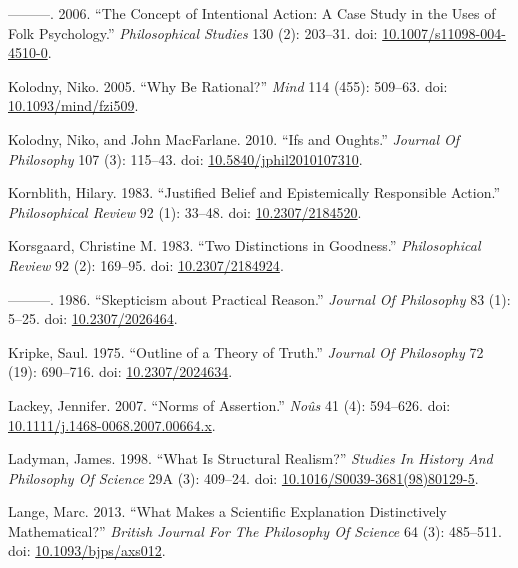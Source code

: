 \documentclass[
  10pt,
  letterpaper,
  DIV=11,
  numbers=noendperiod,
  twoside]{scrartcl}
\newlength{\cslhangindent}
\newenvironment{CSLReferences}[2] %
 {\begin{list}{}{%
  \setlength{\itemindent}{0pt}
  \setlength{\leftmargin}{0pt}
  \setlength{\parsep}{0pt}
  \ifodd #1
   \setlength{\leftmargin}{\cslhangindent}
   \setlength{\itemindent}{-1\cslhangindent}
  \fi
  \setlength{\itemsep}{#2\baselineskip}}}
 {\end{list}}
\begin{document}
\begin{CSLReferences}{1}{0}
---------. 2006. {``The Concept of Intentional Action: A Case Study in
the Uses of Folk Psychology.''} \emph{Philosophical Studies} 130 (2):
203--31. doi:
\href{https://doi.org/10.1007/s11098-004-4510-0}{10.1007/s11098-004-4510-0}.

Kolodny, Niko. 2005. {``Why Be Rational?''} \emph{Mind} 114 (455):
509--63. doi:
\href{https://doi.org/10.1093/mind/fzi509}{10.1093/mind/fzi509}.

Kolodny, Niko, and John MacFarlane. 2010. {``Ifs and Oughts.''}
\emph{Journal Of Philosophy} 107 (3): 115--43. doi:
\href{https://doi.org/10.5840/jphil2010107310}{10.5840/jphil2010107310}.

Kornblith, Hilary. 1983. {``Justified Belief and Epistemically
Responsible Action.''} \emph{Philosophical Review} 92 (1): 33--48. doi:
\href{https://doi.org/10.2307/2184520}{10.2307/2184520}.

Korsgaard, Christine M. 1983. {``Two Distinctions in Goodness.''}
\emph{Philosophical Review} 92 (2): 169--95. doi:
\href{https://doi.org/10.2307/2184924}{10.2307/2184924}.

---------. 1986. {``Skepticism about Practical Reason.''} \emph{Journal
Of Philosophy} 83 (1): 5--25. doi:
\href{https://doi.org/10.2307/2026464}{10.2307/2026464}.

Kripke, Saul. 1975. {``Outline of a Theory of Truth.''} \emph{Journal Of
Philosophy} 72 (19): 690--716. doi:
\href{https://doi.org/10.2307/2024634}{10.2307/2024634}.

Lackey, Jennifer. 2007. {``Norms of Assertion.''} \emph{Noûs} 41 (4):
594--626. doi:
\href{https://doi.org/10.1111/j.1468-0068.2007.00664.x}{10.1111/j.1468-0068.2007.00664.x}.

Ladyman, James. 1998. {``What Is Structural Realism?''} \emph{Studies In
History And Philosophy Of Science} 29A (3): 409--24. doi:
\href{https://doi.org/10.1016/S0039-3681(98)80129-5}{10.1016/S0039-3681(98)80129-5}.

Lange, Marc. 2013. {``What Makes a Scientific Explanation Distinctively
Mathematical?''} \emph{British Journal For The Philosophy Of Science} 64
(3): 485--511. doi:
\href{https://doi.org/10.1093/bjps/axs012}{10.1093/bjps/axs012}.


\end{CSLReferences}
\end{document}
